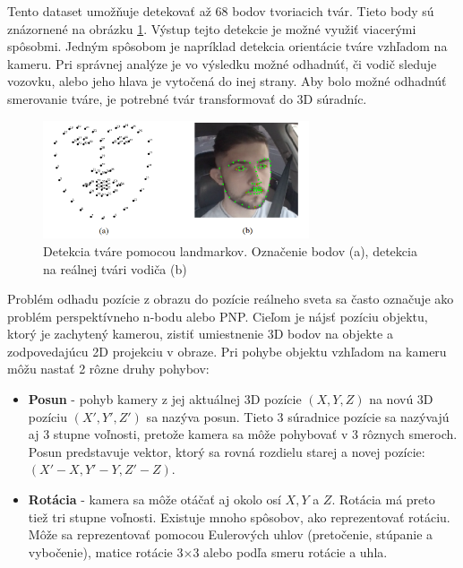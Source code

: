 \documentclass[slovak,master,dept460,male,cpp,cpdeclaration]{diploma}
\begin{document}
Tento dataset  umožňuje detekovať až 68 bodov tvoriacich tvár. Tieto body sú znázornené na obrázku \ref{fig:landmarks}. Výstup tejto detekcie je možné využiť viacerými spôsobmi. Jedným spôsobom je napríklad detekcia orientácie tváre vzhľadom na kameru. Pri správnej analýze je vo výsledku možné odhadnúť, či vodič sleduje vozovku, alebo jeho hlava je vytočená do inej strany. Aby bolo možné odhadnúť smerovanie tváre, je potrebné tvár transformovať do 3D súradníc.

\begin{figure}[H]
	\centering
	\includegraphics[width=0.7\textwidth]{Figures/landmarks.png}
	\caption{Detekcia tváre pomocou landmarkov. Označenie  bodov (a), detekcia na reálnej tvári vodiča (b)}
	\label{fig:landmarks}
\end{figure}


Problém odhadu pozície z obrazu do pozície reálneho sveta sa často označuje ako problém perspektívneho n-bodu alebo PNP. Cieľom je nájsť pozíciu objektu, ktorý je zachytený kamerou, zistiť umiestnenie  3D bodov na objekte a zodpovedajúcu 2D projekciu v obraze. Pri pohybe objektu vzhľadom na kameru môžu nastať 2 rôzne druhy pohybov:
\begin{itemize}
\item\textbf{Posun} - pohyb kamery z jej aktuálnej 3D pozície $(X, Y, Z)$ na novú 3D pozíciu $(X ', Y', Z ')$ sa nazýva posun. Tieto 3 súradnice pozície sa nazývajú aj 3 stupne voľnosti, pretože kamera sa môže pohybovať v 3 rôznych smeroch. Posun predstavuje vektor, ktorý sa rovná rozdielu starej a novej pozície:  $(X '- X, Y' - Y, Z '- Z)$.
\item\textbf{Rotácia} - kamera sa môže otáčať aj okolo osí $X, Y$ a $Z$. Rotácia má preto tiež tri stupne voľnosti. Existuje mnoho spôsobov, ako reprezentovať rotáciu. Môže sa reprezentovať pomocou Eulerových uhlov (pretočenie, stúpanie a vybočenie), matice rotácie 3$\times$3 alebo podľa smeru rotácie a uhla.
\end{itemize}
\end{document}
